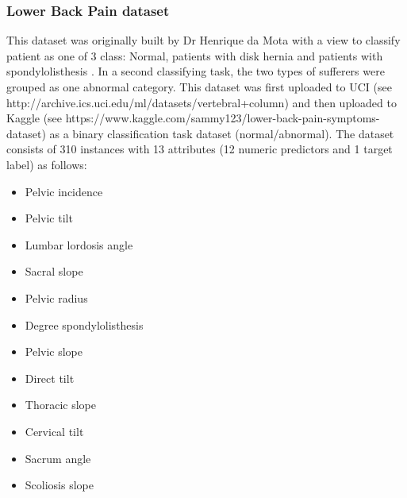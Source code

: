 \subsubsection{Lower Back Pain dataset}
This dataset was originally built by Dr Henrique da Mota with a view to classify patient as one of 3 class: Normal, patients with disk hernia and patients with spondylolisthesis \citep{RochaNeto:2009wp}. In a second classifying task, the two types of sufferers were grouped as one abnormal category. This dataset was first uploaded to UCI (see http://archive.ics.uci.edu/ml/datasets/vertebral+column) and then uploaded to Kaggle (see https://www.kaggle.com/sammy123/lower-back-pain-symptoms-dataset) as a binary classification task dataset (normal/abnormal).\newline
The dataset consists of 310 instances with 13 attributes (12 numeric predictors and 1 target label) as follows:
\begin{itemize}
    \item Pelvic incidence
    \item Pelvic tilt
    \item Lumbar lordosis angle
    \item Sacral slope
    \item Pelvic radius
    \item Degree spondylolisthesis
    \item Pelvic slope
    \item Direct tilt
    \item Thoracic slope
    \item Cervical tilt
    \item Sacrum angle
    \item Scoliosis slope
\end{itemize}

